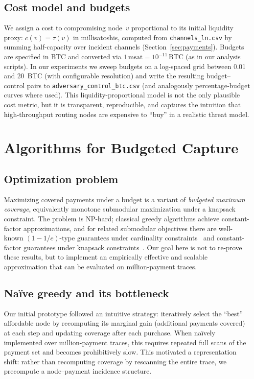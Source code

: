 \documentclass{article}
\begin{document}
\subsection{Cost model and budgets}
We assign a cost to compromising node~$v$ proportional to its initial liquidity proxy: $c(v)=\tau(v)$ in millisatoshis, computed from \texttt{channels\_ln.csv} by summing half-capacity over incident channels (Section~\ref{sec:payments}).
Budgets are specified in BTC and converted via $1\,\mathrm{msat}=10^{-11}\,\mathrm{BTC}$ (as in our analysis scripts).
In our experiments we sweep budgets on a log-spaced grid between 0.01 and 20~BTC (with configurable resolution) and write the resulting budget--control pairs to \texttt{adversary\_control\_btc.csv} (and analogously percentage-budget curves where used).
This liquidity-proportional model is not the only plausible cost metric, but it is transparent, reproducible, and captures the intuition that high-throughput routing nodes are expensive to ``buy'' in a realistic threat model.

\section{Algorithms for Budgeted Capture}
\label{sec:algorithms}

\subsection{Optimization problem}
Maximizing covered payments under a budget is a variant of \emph{budgeted maximum coverage}, equivalently monotone submodular maximization under a knapsack constraint.
The problem is NP-hard; classical greedy algorithms achieve constant-factor approximations, and for related submodular objectives there are well-known $(1-1/e)$-type guarantees under cardinality constraints~\cite{nemhauser1978analysis} and constant-factor guarantees under knapsack constraints~\cite{sviridenko2004submodular}.
Our goal here is not to re-prove these results, but to implement an empirically effective and scalable approximation that can be evaluated on million-payment traces.

\subsection{Na{\"i}ve greedy and its bottleneck}
Our initial prototype followed an intuitive strategy: iteratively select the ``best'' affordable node by recomputing its marginal gain (additional payments covered) at each step and updating coverage after each purchase.
When na{\"i}vely implemented over million-payment traces, this requires repeated full scans of the payment set and becomes prohibitively slow.
This motivated a representation shift: rather than recomputing coverage by rescanning the entire trace, we precompute a node--payment incidence structure.
\end{document}
